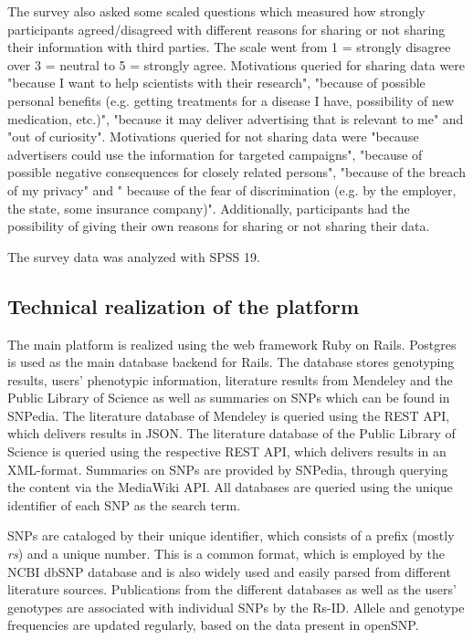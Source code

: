 \documentclass[10pt]{article}
\begin{document}
The survey also asked some scaled questions which measured how strongly participants agreed/disagreed with different reasons for sharing or not sharing their information with third parties. The scale went from 1 = strongly disagree over 3 = neutral to  5 = strongly agree. Motivations queried for sharing data were "because I want to help scientists with their research", "because of possible personal benefits (e.g. getting treatments for a disease I have, possibility of new medication, etc.)", "because it may deliver advertising that is relevant to me" and "out of curiosity". Motivations queried for not sharing data were "because advertisers could use the information for targeted campaigns", "because of possible negative consequences for closely related persons", "because of the breach of my privacy" and " because of the fear of discrimination (e.g. by the employer, the state, some insurance company)". Additionally, participants had the possibility of giving their own reasons for sharing or not sharing their data.

The survey data was analyzed with SPSS 19. 

\subsection*{Technical realization of the platform}
The main platform is realized using the web framework Ruby on Rails. Postgres is used as the main database backend for Rails. The database stores genotyping results, users' phenotypic information, literature results from Mendeley and the Public Library of Science as well as summaries on SNPs which can be found in SNPedia. The literature database of Mendeley is queried using the REST API, which delivers results in JSON. The literature database of the Public Library of Science is queried using the respective REST API, which delivers results in an XML-format. Summaries on SNPs are provided by SNPedia, through querying the content via the MediaWiki API. All databases are queried using the unique identifier of each SNP as the search term. 

SNPs are cataloged by their unique identifier, which consists of a prefix (mostly \textit{rs}) and a unique number. This is a common format, which is employed by the NCBI dbSNP database and is also widely used and easily parsed from different literature sources. Publications from the different databases as well as the users' genotypes are associated with individual SNPs by the Rs-ID. Allele and genotype frequencies are updated regularly, based on the data present in openSNP. 
\end{document}
